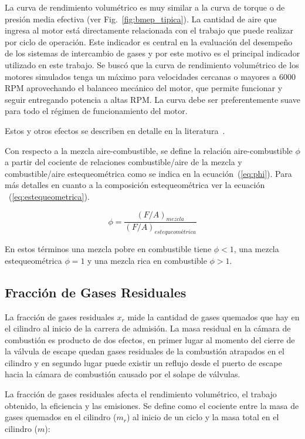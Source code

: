 La curva de rendimiento volumétrico es muy similar a la curva de torque o de
presión media efectiva (ver Fig.~\ref{fig:bmep_tipica}).
%
La cantidad de aire que ingresa al motor está directamente relacionada con el
trabajo que puede realizar por ciclo de operación.
%
Este indicador es central en la evaluación del desempeño de los sistemas de
intercambio de gases y por este motivo es el principal indicador utilizado en
este trabajo.
%
Se buscó que la curva de rendimiento volumétrico de los motores simulados tenga
un máximo para velocidades cercanas o mayores a 6000 RPM aprovechando el
balanceo mecánico del motor, que permite funcionar y seguir entregando potencia
a altas RPM.
%
La curva debe ser preferentemente suave para todo el régimen de funcionamiento
del motor.

Estos y otros efectos se describen en detalle en la
literatura~\parencite{heywood}.
%

Con respecto a la mezcla aire-combustible, se define la relación
aire-combustible $\phi$ a partir del cociente de relaciones combustible/aire
de la mezcla y combustible/aire estequeométrica como se indica en la
ecuación~(\ref{eq:phi}).
%
Para más detalles en cuanto a la composición estequeométrica ver la ecuación
~(\ref{eq:estequeometrica}).

\begin{equation}
  \label{eq:phi}
  \phi = \frac{(F/A)_{mezcla}}{(F/A)_{estequeométrica}}
\end{equation}

En estos términos una mezcla pobre en combustible tiene $\phi < 1$, una mezcla
estequeométrica $\phi=1$ y una mezcla rica en combustible $\phi > 1$.


\subsection{Fracción de Gases Residuales}
%
La fracción de gases residuales $x_r$ mide la cantidad de gases quemados que hay
en el cilindro al inicio de la carrera de admisión.
%
La masa residual en la cámara de combustión es producto de dos efectos, en
primer lugar al momento del cierre de la válvula de escape quedan gases
residuales de la combustión atrapados en el cilindro y en segundo lugar puede
existir un reflujo desde el puerto de escape hacia la cámara de combustión
causado por el solape de válvulas.

La fracción de gases residuales afecta el rendimiento volumétrico, el trabajo
obtenido, la eficiencia y las emisiones.
%
Se define como el cociente entre la masa de gases quemados en el cilindro
($m_{r}$) al inicio de un ciclo y la masa total en el cilindro ($m$):


